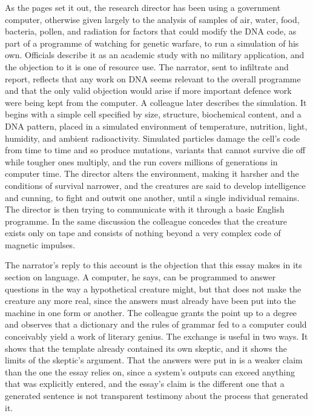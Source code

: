 \documentclass[11pt]{article}
\theoremstyle{remark}
\begin{document}
As the pages set it out, the research director has been using a government computer, otherwise given largely to the analysis of samples of air, water, food, bacteria, pollen, and radiation for factors that could modify the DNA code, as part of a programme of watching for genetic warfare, to run a simulation of his own. Officials describe it as an academic study with no military application, and the objection to it is one of resource use. The narrator, sent to infiltrate and report, reflects that any work on DNA seems relevant to the overall programme and that the only valid objection would arise if more important defence work were being kept from the computer. A colleague later describes the simulation. It begins with a simple cell specified by size, structure, biochemical content, and a DNA pattern, placed in a simulated environment of temperature, nutrition, light, humidity, and ambient radioactivity. Simulated particles damage the cell's code from time to time and so produce mutations, variants that cannot survive die off while tougher ones multiply, and the run covers millions of generations in computer time. The director alters the environment, making it harsher and the conditions of survival narrower, and the creatures are said to develop intelligence and cunning, to fight and outwit one another, until a single individual remains. The director is then trying to communicate with it through a basic English programme. In the same discussion the colleague concedes that the creature exists only on tape and consists of nothing beyond a very complex code of magnetic impulses.

The narrator's reply to this account is the objection that this essay makes in its section on language. A computer, he says, can be programmed to answer questions in the way a hypothetical creature might, but that does not make the creature any more real, since the answers must already have been put into the machine in one form or another. The colleague grants the point up to a degree and observes that a dictionary and the rules of grammar fed to a computer could conceivably yield a work of literary genius. The exchange is useful in two ways. It shows that the template already contained its own skeptic, and it shows the limits of the skeptic's argument. That the answers were put in is a weaker claim than the one the essay relies on, since a system's outputs can exceed anything that was explicitly entered, and the essay's claim is the different one that a generated sentence is not transparent testimony about the process that generated it.
\end{document}
